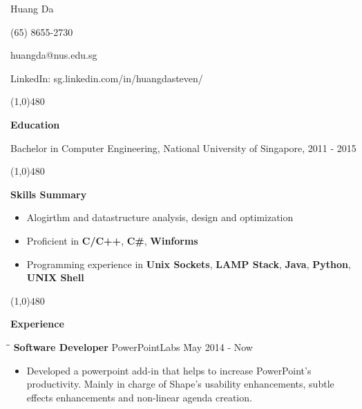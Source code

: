 \documentclass[9pt]{article}
\begin{document}
\clearpage

\centerline{{\Huge \sc Huang Da} }
\centerline{(65) 8655-2730}
\centerline{huangda@nus.edu.sg}
\centerline{LinkedIn: sg.linkedin.com/in/huangdasteven/}

\noindent

\centerline{\line(1,0){480}}

\medskip

\centerline {\Large \bf Education}

\smallskip

Bachelor in Computer Engineering, National University of Singapore, 2011 - 2015

\centerline{\line(1,0){480}}

\medskip

\centerline {\Large \bf Skills Summary}

\vspace{-6pt}\smallskip

\begin{itemize} 
  \item Alogirthm and datastructure analysis, design and optimization \vspace{-6pt}
  \item Proficient in {\bf C/C++}, {\bf C\#}, {\bf Winforms} \vspace{-6pt}
  \item Programming experience in  {\bf Unix Sockets}, {\bf LAMP Stack}, {\bf Java}, {\bf Python}, {\bf UNIX Shell}  \vspace{-6pt}
\end{itemize}

\centerline{\line(1,0){480}}

\medskip

\centerline {\Large \bf Experience}

\medskip



\begin{tabbing}
\hspace{2.6in}\= \hspace{2.6in}\= \kill
{\bf Software Developer} \> PowerPointLabs \`May 2014 - Now\
\end{tabbing}

\begin{itemize}
    \item Developed a powerpoint add-in that helps to increase PowerPoint's productivity. Mainly in charge of Shape's usability enhancements, subtle effects enhancements and non-linear agenda creation.\vspace{-6pt}
\end{itemize}
\end{document}
